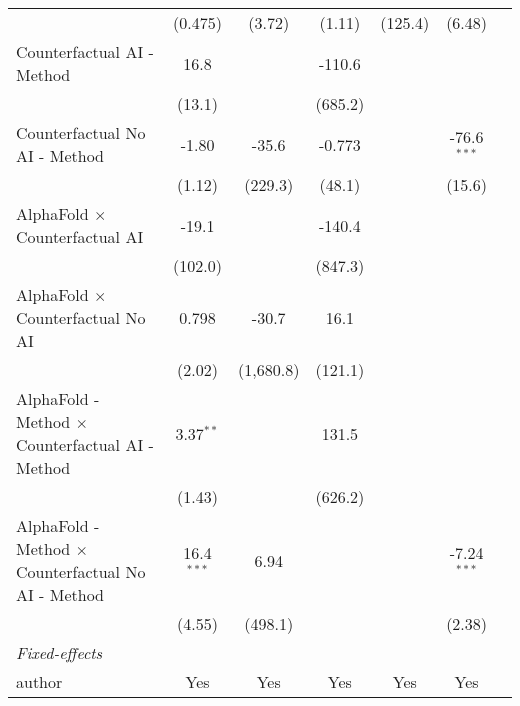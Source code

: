 \begin{tabular}{lcccccc}
                                                              & (0.475)      & (3.72)    & (1.11)      & (125.4)          & (6.48)         &   \\   
   Counterfactual AI - Method                                 & 16.8         &           & -110.6      &                  &                &   \\   
                                                              & (13.1)       &           & (685.2)     &                  &                &   \\   
   Counterfactual No AI - Method                              & -1.80        & -35.6     & -0.773      &                  & -76.6$^{***}$  &   \\   
                                                              & (1.12)       & (229.3)   & (48.1)      &                  & (15.6)         &   \\   
   AlphaFold $\times$ Counterfactual AI                       & -19.1        &           & -140.4      &                  &                &   \\   
                                                              & (102.0)      &           & (847.3)     &                  &                &   \\   
   AlphaFold $\times$ Counterfactual No AI                    & 0.798        & -30.7     & 16.1        &                  &                &   \\   
                                                              & (2.02)       & (1,680.8) & (121.1)     &                  &                &   \\   
   AlphaFold - Method $\times$ Counterfactual AI - Method     & 3.37$^{**}$  &           & 131.5       &                  &                &   \\   
                                                              & (1.43)       &           & (626.2)     &                  &                &   \\   
   AlphaFold - Method $\times$ Counterfactual No AI - Method  & 16.4$^{***}$ & 6.94      &             &                  & -7.24$^{***}$  &   \\   
                                                              & (4.55)       & (498.1)   &             &                  & (2.38)         &   \\   
   \midrule
   \emph{Fixed-effects}\\
   author                                                     & Yes          & Yes       & Yes         & Yes              & Yes            & \\  

\end{tabular}
